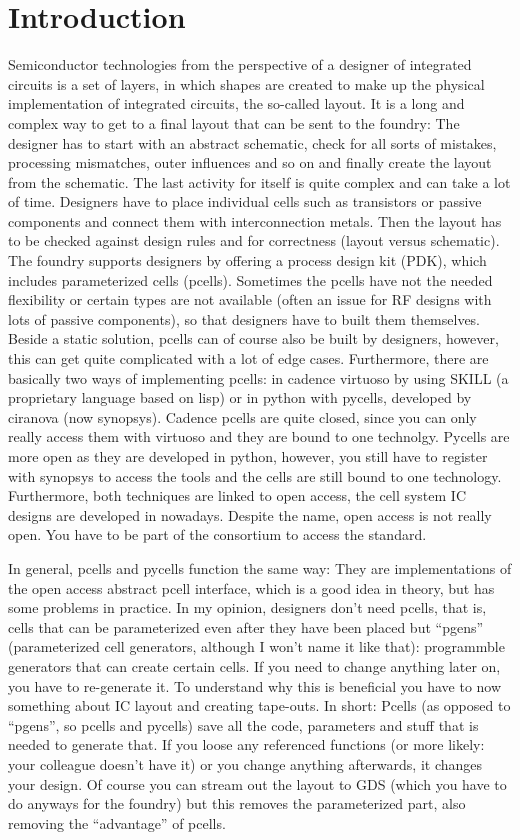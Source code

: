 \section{Introduction}
Semiconductor technologies from the perspective of a designer of integrated circuits is a set of layers, in which shapes are created to make up the physical implementation of integrated circuits, the so-called layout.
It is a long and complex way to get to a final layout that can be sent to the foundry:
The designer has to start with an abstract schematic, check for all sorts of mistakes, processing mismatches, outer influences and so on and finally create the layout from the schematic.
The last activity for itself is quite complex and can take a lot of time.
Designers have to place individual cells such as transistors or passive components and connect them with interconnection metals.
Then the layout has to be checked against design rules and for correctness (layout versus schematic).
The foundry supports designers by offering a process design kit (PDK), which includes parameterized cells (pcells).
Sometimes the pcells have not the needed flexibility or certain types are not available (often an issue for RF designs with lots of passive components), so that designers have to built them themselves.
Beside a static solution, pcells can of course also be built by designers, however, this can get quite complicated with a lot of edge cases.
Furthermore, there are basically two ways of implementing pcells: in cadence virtuoso by using SKILL (a proprietary language based on lisp) or in python with pycells, developed by ciranova (now synopsys).
Cadence pcells are quite closed, since you can only really access them with virtuoso and they are bound to one technolgy.
Pycells are more open as they are developed in python, however, you still have to register with synopsys to access the tools and the cells are still bound to one technology.
Furthermore, both techniques are linked to open access, the cell system IC designs are developed in nowadays.
Despite the name, open access is not really open. You have to be part of the consortium to access the standard.

In general, pcells and pycells function the same way:
They are implementations of the open access abstract pcell interface, which is a good idea in theory, but has some problems in practice.
In my opinion, designers don't need pcells, that is, cells that can be parameterized even after they have been placed but \enquote{pgens} (parameterized cell generators, although I won't name it like that): programmble generators that can create certain cells.
If you need to change anything later on, you have to re-generate it.
To understand why this is beneficial you have to now something about IC layout and creating tape-outs.
In short: Pcells (as opposed to \enquote{pgens}, so pcells and pycells) save all the code, parameters and stuff that is needed to generate that.
If you loose any referenced functions (or more likely: your colleague doesn't have it) or you change anything afterwards, it changes your design.
Of course you can stream out the layout to GDS (which you have to do anyways for the foundry) but this removes the parameterized part, also removing the \enquote{advantage} of pcells.

